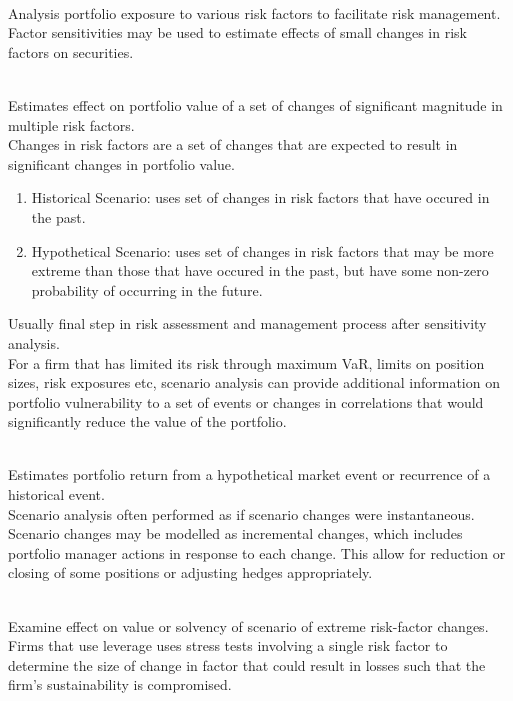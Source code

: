 \begin{remark} \\
Analysis portfolio exposure to various risk factors to facilitate risk management.\\
Factor sensitivities may be used to estimate effects of small changes in risk factors on securities.
\end{remark}

\begin{remark} \\
Estimates effect on portfolio value of a set of changes of significant magnitude in multiple risk factors.\\
Changes in risk factors are a set of changes that are expected to result in significant changes in portfolio value.
\begin{enumerate}[label=\roman*.]
\setlength{\itemsep}{0pt}
\item Historical Scenario: uses set of changes in risk factors that have occured in the past.
\item Hypothetical Scenario: uses set of changes in risk factors that may be more extreme than those that have occured in the past, but have some non-zero probability of occurring in the future.
\end{enumerate}
Usually final step in risk assessment and management process after sensitivity analysis.\\
For a firm that has limited its risk through maximum VaR, limits on position sizes, risk exposures etc, scenario analysis can provide additional information on portfolio vulnerability to a set of events or changes in correlations that would significantly reduce the value of the portfolio.
\end{remark}

\begin{remark} \\
Estimates portfolio return from a hypothetical market event or recurrence of a historical event.\\
Scenario analysis often performed as if scenario changes were instantaneous.\\
Scenario changes may be modelled as incremental changes, which includes portfolio manager actions in response to each change. This allow for reduction or closing of some positions or adjusting hedges appropriately. 
\end{remark}

\begin{remark} \\
Examine effect on value or solvency of scenario of extreme risk-factor changes.\\
Firms that use leverage uses stress tests involving a single risk factor to determine the size of change in factor that could result in losses such that the firm's sustainability is compromised.
\end{remark}

